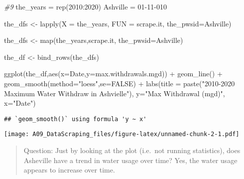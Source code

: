 \documentclass[
]{article}
\newenvironment{Shaded}{\begin{snugshade}}{\end{snugshade}}
\newcommand{\AttributeTok}[1]{\textcolor[rgb]{0.77,0.63,0.00}{#1}}
\newcommand{\CommentTok}[1]{\textcolor[rgb]{0.56,0.35,0.01}{\textit{#1}}}
\newcommand{\ConstantTok}[1]{\textcolor[rgb]{0.00,0.00,0.00}{#1}}
\newcommand{\DecValTok}[1]{\textcolor[rgb]{0.00,0.00,0.81}{#1}}
\newcommand{\FunctionTok}[1]{\textcolor[rgb]{0.00,0.00,0.00}{#1}}
\newcommand{\NormalTok}[1]{#1}
\newcommand{\OtherTok}[1]{\textcolor[rgb]{0.56,0.35,0.01}{#1}}
\newcommand{\SpecialCharTok}[1]{\textcolor[rgb]{0.00,0.00,0.00}{#1}}
\newcommand{\StringTok}[1]{\textcolor[rgb]{0.31,0.60,0.02}{#1}}
\begin{document}
\begin{Shaded}
\begin{Highlighting}[]
\CommentTok{\#9}
\NormalTok{the\_years }\OtherTok{=} \FunctionTok{rep}\NormalTok{(}\DecValTok{2010}\SpecialCharTok{:}\DecValTok{2020}\NormalTok{)}
\NormalTok{Ashville }\OtherTok{=} \StringTok{\textquotesingle{}01{-}11{-}010\textquotesingle{}}

\NormalTok{the\_dfs }\OtherTok{\textless{}{-}} \FunctionTok{lapply}\NormalTok{(}\AttributeTok{X =}\NormalTok{ the\_years,}
                  \AttributeTok{FUN =}\NormalTok{ scrape.it,}
                  \AttributeTok{the\_pwsid=}\NormalTok{Ashville)}

\NormalTok{the\_dfs }\OtherTok{\textless{}{-}} \FunctionTok{map}\NormalTok{(the\_years,scrape.it, }\AttributeTok{the\_pwsid=}\NormalTok{Ashville)}

\NormalTok{the\_df }\OtherTok{\textless{}{-}} \FunctionTok{bind\_rows}\NormalTok{(the\_dfs)}

\FunctionTok{ggplot}\NormalTok{(the\_df,}\FunctionTok{aes}\NormalTok{(}\AttributeTok{x=}\NormalTok{Date,}\AttributeTok{y=}\NormalTok{max.withdrawals.mgd)) }\SpecialCharTok{+} 
  \FunctionTok{geom\_line}\NormalTok{() }\SpecialCharTok{+} 
  \FunctionTok{geom\_smooth}\NormalTok{(}\AttributeTok{method=}\StringTok{"loess"}\NormalTok{,}\AttributeTok{se=}\ConstantTok{FALSE}\NormalTok{) }\SpecialCharTok{+}
  \FunctionTok{labs}\NormalTok{(}\AttributeTok{title =} \FunctionTok{paste}\NormalTok{(}\StringTok{"2010{-}2020 Maximum Water Withdraw in Ashvielle"}\NormalTok{),}
       \AttributeTok{y=}\StringTok{"Max Withdrawal (mgd)"}\NormalTok{,}
       \AttributeTok{x=}\StringTok{"Date"}\NormalTok{)}
\end{Highlighting}
\end{Shaded}

\begin{verbatim}
## `geom_smooth()` using formula 'y ~ x'
\end{verbatim}

\texttt{[image: A09\_DataScraping\_files/figure-latex/unnamed-chunk-2-1.pdf]}

\begin{quote}
Question: Just by looking at the plot (i.e.~not running statistics),
does Asheville have a trend in water usage over time? Yes, the water
usage appears to increase over time.
\end{quote}
\end{document}
